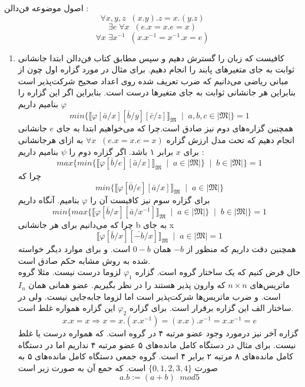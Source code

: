	\quad\vspace {-0.5cm}
	\begin{ans}
			اصول موضوعه فن‌دالن : \\
			$$
				\forall x,y,z \;\;(x.y).z = x.(y.z)
			$$
			$$
				\exists e \;  \forall x\;\;(e.x = x.e = x)
			$$
			$$
				\forall x \; \exists x^{-1}\;\; (x.x^{-1} = x^{-1}. x = e)
			$$
		\begin{enumerate}[label = \alph*)]
			\item
			کافیست که زبان را گسترش دهیم و سپس مطابق کتاب فن‌دالن ابتدا جانشانی ثوابت به جای متغیر‌های پابند را انجام دهیم. برای مثال در مورد گزاره اول چون از مبانی ریاضی می‌دانیم که ضرب تعریف شده روی اعداد صحیح شرکت‌پذیر است بنابراین هر جانشانی ثوابت به جای متغیر‌ها درست است. بنابراین اگر این گزاره را 
			$\varphi$
			بنامیم داریم
			$$
				min\{\llbracket \varphi[\bar a / x][\bar b / y][\bar c / z] \rrbracket _ \mathfrak{M} \;\;|\;\; a, b, c \in \mid \mathfrak{M} \mid \} = 1
			$$
			همچنین گزاره‌های دوم نیز صادق است.چرا که می‌خواهیم ابتدا به جای 
			$e$
			جانشانی انجام دهیم که تحت مدل ارزش گزاره
			$\forall x\;\;(e.x = x.e = x)$
			به ازای هر‌جانشانی برای 
			$x$
			برابر ۱ باشد. 
			 اگر گزاره دوم را 
			$\psi$
			بنامیم داریم :‌
			$$
				max\{min\{\llbracket \varphi[\bar b / e][\bar a / x] \rrbracket_\mathfrak{M} \;\;|\;\; a \in \mid \mathfrak{M} \mid \} \;\;|\;\; b \in \mid \mathfrak{M} \mid \} = 1
			$$
			چرا که
			$$
				min\{\llbracket \varphi[\bar 0 / e][\bar a / x] \rrbracket_\mathfrak{M} \;\;|\;\; a \in \mid \mathfrak{M} \mid \}
			$$
			برای گزاره سوم نیز کافیست آن را 
			$\varphi$
			بنامیم. آنگاه داریم
			$$
				min\{max\{\llbracket \varphi[\bar b / x][\bar a / x^{-1}] \rrbracket_\mathfrak{M} \;\;|\;\; a \in \mid \mathfrak{M} \mid \} \;\;|\;\; b \in \mid \mathfrak{M} \mid \} = 1
			$$
			چرا که می‌دانیم برای هر جانشانی b به جای x
			$$
				\llbracket \varphi[\bar b / x][ \bar{-b} / x] \rrbracket_\mathfrak{M} \;\;|\;\; a \in \mid \mathfrak{M} \mid = 1
			$$
			همچنین دقت داریم که منظور از 
			$-b$
			همان
			$ 0 - b $
			است.
			و برای موارد دیگر خواسته شده به روش مشابه حکم صادق است.\\
			حال فرض کنیم که یک ساختار گروه است. گزاره 
			$\varphi _ 1$
			لزوما درست نیست. مثلا گروه ماتریس‌های
			 $n \times n$
			  که وارون پذیر هستند را در نظر بگیریم.
			عضو همانی همان 
			$I_n$
			است. و ضرب ماتریس‌ها شرکت‌پذیر است اما لزوما جا‌به‌جایی نیست. ولی در ساختار الف این گزاره برقرار است.
			برای گزاره 
			$\varphi_2$
			 این گزاره همواره غلط است.
			 $$
			 	x.x = x \Longrightarrow x = x.(x.x^{-1}) = (x.x).x^{-1} = x.x^{-1} = e
			 $$
			 گزاره آخر نیز درمورد وجود عضو مرتبه ۴ در گروه است. که همواره درست یا غلط نیست. برای مثال در دستگاه کامل‌ مانده‌های ۵ عضو مرتبه ۴ نداریم اما در دستگاه کامل مانده‌های ۸ مرتبه ۲ برابر ۴ است. گروه جمعی دستگاه کامل مانده‌های ۵ به صورت
			 $\{0, 1, 2, 3, 4\}$
			 است. که حمع آن به صورت زیر است
			 $$
			 	a.b := (a + b) \;\; mod 5
			 $$
		\end{enumerate}
	\end{ans}
